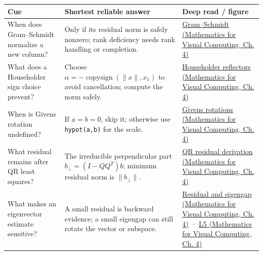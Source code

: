 {\def\LTcaptype{none} %
\begin{longtable}[]{@{}
  >{\raggedright\arraybackslash}p{}
  >{\raggedright\arraybackslash}p{}
  >{\raggedright\arraybackslash}p{}@{}}
\toprule\noalign{}
\begin{minipage}[b]{\linewidth}\raggedright
Cue
\end{minipage} & \begin{minipage}[b]{\linewidth}\raggedright
Shortest reliable answer
\end{minipage} & \begin{minipage}[b]{\linewidth}\raggedright
Deep read / figure
\end{minipage} \\
\midrule\noalign{}
\endhead
\bottomrule\noalign{}
\endlastfoot
When does Gram--Schmidt normalize a new column? & Only if its residual norm is safely nonzero; rank deficiency needs rank handling or completion. & \href{../02-Mathematics-for-Visual-Computing/main.pdf\#nameddest=01-foundations-i-ch020-orthogonal-coordinates-preserve-the-shape-of-the-problem}{Gram--Schmidt (Mathematics for Visual Computing, Ch. 4)} \\
What does a Householder sign choice prevent? & Choose \(\alpha=-\operatorname{copysign}(\|x\|,x_1)\) to avoid cancellation; compute the norm safely. & \href{../02-Mathematics-for-Visual-Computing/main.pdf\#nameddest=01-foundations-i-ch020-reflections-and-plane-rotations-build-qr-without-losing-lengths}{Householder reflectors (Mathematics for Visual Computing, Ch. 4)} \\
When is Givens rotation undefined? & If \(a=b=0\), skip it; otherwise use \texttt{hypot(a,b)} for the scale. & \href{../02-Mathematics-for-Visual-Computing/main.pdf\#nameddest=01-foundations-i-ch020-reflections-and-plane-rotations-build-qr-without-losing-lengths}{Givens rotations (Mathematics for Visual Computing, Ch. 4)} \\
What residual remains after QR least squares? & The irreducible perpendicular part \(b_\perp=(I-QQ^T)b\); minimum residual norm is \(\|b_\perp\|\). & \href{../02-Mathematics-for-Visual-Computing/main.pdf\#nameddest=01-foundations-i-ch020-qr-turns-least-squares-into-a-triangular-solve-plus-an-irreducible-residual}{QR residual derivation (Mathematics for Visual Computing, Ch. 4)} \\
What makes an eigenvector estimate sensitive? & A small residual is backward evidence; a small eigengap can still rotate the vector or subspace. & \href{../02-Mathematics-for-Visual-Computing/main.pdf\#nameddest=01-foundations-i-ch020-residuals-distinguish-backward-accuracy-from-forward-certainty}{Residual and eigengap (Mathematics for Visual Computing, Ch. 4)} · \href{../02-Mathematics-for-Visual-Computing/main.pdf\#nameddest=01-foundations-i-ch020-figure-l5---eigenanalysis-is-cleanest-when-the-basis-is-orthonormal}{L5 (Mathematics for Visual Computing, Ch. 4)} \\

\end{longtable}}
